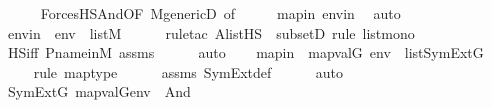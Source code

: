 \begin{isabellebody}
\ \ \ \ \isamarkupfalse%
\ ForcesHS{\isacharunderscore}{\kern0pt}And{\isacharbrackleft}{\kern0pt}OF\ M{\isacharunderscore}{\kern0pt}genericD{\isacharcomma}{\kern0pt}\ of\ {\isacharunderscore}{\kern0pt}\ {\isacharunderscore}{\kern0pt}\ {\isacharunderscore}{\kern0pt}\ {\isasymphi}\ {\isasympsi}{\isacharbrackright}{\kern0pt}\ mapin\ envin\ \isamarkupfalse%
\ auto\isanewline
{}\isamarkupfalse%
\ \isanewline
\ \ \isamarkupfalse%
\ envin\ {\isacharcolon}{\kern0pt}\ {\isachardoublequoteopen}env\ {\isasymin}\ list{\isacharparenleft}{\kern0pt}M{\isacharparenright}{\kern0pt}{\isachardoublequoteclose}\ \isanewline
\ \ \ \ \isamarkupfalse%
{\isacharparenleft}{\kern0pt}rule{\isacharunderscore}{\kern0pt}tac\ A{\isacharequal}{\kern0pt}{\isachardoublequoteopen}list{\isacharparenleft}{\kern0pt}HS{\isacharparenright}{\kern0pt}{\isachardoublequoteclose}\ \ subsetD{\isacharcomma}{\kern0pt}\ rule\ list{\isacharunderscore}{\kern0pt}mono{\isacharparenright}{\kern0pt}\isanewline
\ \ \ \ \isamarkupfalse%
\ HS{\isacharunderscore}{\kern0pt}iff\ P{\isacharunderscore}{\kern0pt}name{\isacharunderscore}{\kern0pt}in{\isacharunderscore}{\kern0pt}M\ assms\isanewline
\ \ \ \ \isamarkupfalse%
\ auto\isanewline
\ \ \isamarkupfalse%
\ mapin\ {\isacharcolon}{\kern0pt}\ {\isachardoublequoteopen}map{\isacharparenleft}{\kern0pt}val{\isacharparenleft}{\kern0pt}G{\isacharparenright}{\kern0pt}{\isacharcomma}{\kern0pt}\ env{\isacharparenright}{\kern0pt}\ {\isasymin}\ list{\isacharparenleft}{\kern0pt}SymExt{\isacharparenleft}{\kern0pt}G{\isacharparenright}{\kern0pt}{\isacharparenright}{\kern0pt}{\isachardoublequoteclose}\ \isanewline
\ \ \ \ \isamarkupfalse%
{\isacharparenleft}{\kern0pt}rule\ map{\isacharunderscore}{\kern0pt}type{\isacharparenright}{\kern0pt}\isanewline
\ \ \ \ \isamarkupfalse%
\ assms\ SymExt{\isacharunderscore}{\kern0pt}def\isanewline
\ \ \ \ \isamarkupfalse%
\ auto\isanewline
\isanewline
\ \ \isamarkupfalse%
\ {\isachardoublequoteopen}SymExt{\isacharparenleft}{\kern0pt}G{\isacharparenright}{\kern0pt}{\isacharcomma}{\kern0pt}\ map{\isacharparenleft}{\kern0pt}val{\isacharparenleft}{\kern0pt}G{\isacharparenright}{\kern0pt}{\isacharcomma}{\kern0pt}env{\isacharparenright}{\kern0pt}\ {\isasymTurnstile}\ And{\isacharparenleft}{\kern0pt}{\isasymphi}{\isacharcomma}{\kern0pt}{\isasympsi}{\isacharparenright}{\kern0pt}{\isachardoublequoteclose}\isanewline
\ \ \isamarkupfalse%

\end{isabellebody}
